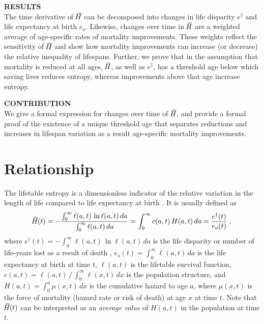 \documentclass[a4paper,twoside, openright, 12pt, leqno]{article}
\newcommand*\xbar[1]{%
   \hbox{%
     \vbox{%
       \hrule height 0.5pt %
       \kern0.3ex%
       \hbox{%
         \kern-0.28em%
         \ensuremath{#1}%
         \kern-0.05em%
       }%
     }%
   }%
}
\begin{document}
\noindent\textbf{RESULTS} \\
The time derivative of $\,\xbar{H}$ can be decomposed into changes in life disparity $e^\dagger$ and life expectancy at birth $e_o$. Likewise, changes over time in $\,\xbar{H}$ are a weighted average of age-specific rates of mortality improvements. These weights reflect the sensitivity of $\,\xbar{H}$ and show how mortality improvements can increase (or decrease) the relative inequality of lifespans. Further, we prove that in the assumption that mortality is reduced at all ages, $\,\xbar{H}$, as well as $e^\dagger$, has a threshold age below which saving lives reduces entropy, whereas improvements above that age increase entropy.
\bigskip

\noindent\textbf{CONTRIBUTION} \\
We give a formal expression for changes over time of $\,\xbar{H}$, and provide a formal proof of the existence of a unique threshold age that separates reductions and increases in lifespan variation as a result age-specific mortality improvements.

\linespread{2}\normalsize
\clearpage



\section{Relationship}
The lifetable entropy is a dimensionless indicator of the relative variation in the length of life compared to life expectancy at birth \citep{keyfitz1968introduction,demetrius1974demographic,Keyfitz1977, demetrius1978adaptive}. It is usually defined as
%
\begin{equation*}
\xbar{H}(t)=-\frac{\int_0^\infty\ell(a, t)\,\ln\ell(a, t)\,da}{\int_0^\infty\ell(a, t)\,da}=\int_0^\infty c(a, t)\,H(a,t)\,da=\frac{e^\dagger(t)}{e_o(t)}\;,
\end{equation*}
%
where $e^\dagger(t)=-\int_0^\infty\ell(a,t)\,\ln\ell(a,t)\,da$ is the life disparity or number of life-years lost as a result of death \citep{Vaupel2003}, $e_o(t)=\int_0^\infty\ell(a, t)\,da$ is the life expectancy at birth at time $t$, $\ell(a,t)$ is the lifetable survival function, $c(a,t)=\ell(a,t)\,/\,\int_0^\infty\ell(x,t)\,dx$ is the population structure, and $H(a,t)=\int_0^a\mu(x,t)\,dx$ is the cumulative hazard to age $a$, where $\mu(x,t)$ is the force of mortality (hazard rate or risk of death) at age $x$ at time $t$. Note that $\,\xbar{H}(t)$ can be interpreted as an \emph{average value} of $H(a,t)$ in the population at time $t$.
\end{document}
